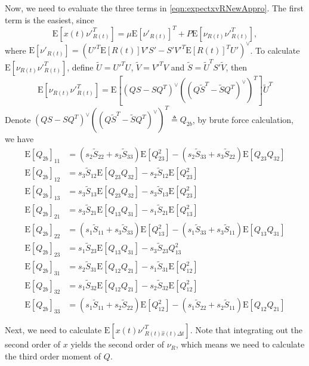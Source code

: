 \documentclass[10pt]{article}
\newcommand{\expect}[1]{\ensuremath{\mathrm{E}\left[ #1 \right]}}
\begin{document}
Now, we need to evaluate the three terms in \eqref{eqn:expectxvRNewAppro}.
The first term is the easiest, since
\begin{equation}
	\expect{x(t)\nu'^T_{R(t)}} = \mu\expect{\nu'_{R(t)}}^T + P\expect{\nu_{R(t)}\nu'^T_{R(t)}},
\end{equation}
where $\expect{\nu'_{R(t)}} = (U'^T\expect{R(t)}V'S'-S'V'^T\expect{R(t)}^TU')^\vee$.
To calculate $\expect{\nu_{R(t)}\nu'^T_{R(t)}}$, define $\tilde{U} = U'^TU$, $\tilde{V} = V'^TV$ and $\tilde{S} = \tilde{U}^TS'\tilde{V}$, then
\begin{equation*}
	\expect{\nu_{R(t)}\nu'^T_{R(t)}} = \expect{(QS-SQ^T)^\vee\left((Q\tilde{S}^T-\tilde{S}Q^T)^\vee\right)^T}\tilde{U}^T
\end{equation*}
Denote $(QS-SQ^T)^\vee\left((Q\tilde{S}^T-\tilde{S}Q^T)^\vee\right)^T \triangleq Q_{2b}$, by brute force calculation, we have
\begin{align*}
	\expect{Q_{2b}}_{11} &= (s_2\tilde{S}_{22}+s_3\tilde{S}_{33})\expect{Q_{23}^2} - (s_2\tilde{S}_{33}+s_3\tilde{S}_{22})\expect{Q_{23}Q_{32}} \\
	\expect{Q_{2b}}_{12} &= s_3\tilde{S}_{12}\expect{Q_{23}Q_{32}} - s_2\tilde{S}_{12}\expect{Q_{23}^2} \\
	\expect{Q_{2b}}_{13} &= s_3\tilde{S}_{13}\expect{Q_{23}Q_{32}} - s_3\tilde{S}_{13}\expect{Q_{23}^2} \\
	\expect{Q_{2b}}_{21} &= s_3\tilde{S}_{21}\expect{Q_{13}Q_{31}} - s_1\tilde{S}_{21}\expect{Q_{13}^2} \\
	\expect{Q_{2b}}_{22} &= (s_1\tilde{S}_{11}+s_3\tilde{S}_{33})\expect{Q_{13}^2} - (s_1\tilde{S}_{33}+s_3\tilde{S}_{11})\expect{Q_{13}Q_{31}} \\
	\expect{Q_{2b}}_{23} &= s_1\tilde{S}_{23}\expect{Q_{13}Q_{31}} - s_3\tilde{S}_{23}{Q_{13}^2} \\
	\expect{Q_{2b}}_{31} &= s_2\tilde{S}_{31}\expect{Q_{12}Q_{21}} - s_1\tilde{S}_{31}\expect{Q_{12}^2} \\
	\expect{Q_{2b}}_{32} &= s_1\tilde{S}_{32}\expect{Q_{12}Q_{21}} - s_2\tilde{S}_{32}\expect{Q_{12}^2} \\
	\expect{Q_{2b}}_{33} &= (s_1\tilde{S}_{11}+s_2\tilde{S}_{22})\expect{Q_{12}^2} - (s_1\tilde{S}_{22}+s_2\tilde{S}_{11})\expect{Q_{12}Q_{21}}
\end{align*}

Next, we need to calculate $\expect{x(t)\nu'^T_{R(t)\hat{x}(t)\Delta t}}$.
Note that integrating out the second order of $x$ yields the second order of $\nu_R$, which means we need to calculate the third order moment of $Q$.
\end{document}
